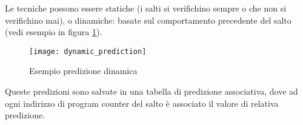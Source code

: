 \documentclass[../template]{subfiles}
\begin{document}
Le tecniche possono essere statiche (i salti si verifichino sempre o che non si verifichino mai), o dinamiche: basate
sul comportamento precedente del salto (vedi esempio in figura \ref{fig:dynamic_prediction}).

\begin{figure}[h]
    \centering
    \texttt{[image: dynamic\_prediction]}
    \caption{Esempio predizione dinamica}
    \label{fig:dynamic_prediction}
\end{figure}

Queste predizioni sono salvate in una tabella di predizione associativa, dove ad ogni indirizzo di program counter del
salto è associato il valore di relativa predizione.

\end{document}

